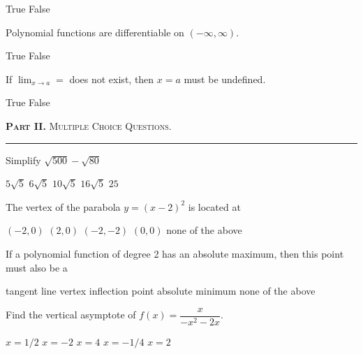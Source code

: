 \documentclass[legalpaper, 12pt, addpoints]{exam}
\begin{document}
\begin{questions}
\begin{oneparchoices}
    \CorrectChoice True
    \choice False
\end{oneparchoices}

\question  Polynomial functions are differentiable on \((-\infty,\infty)\).

\begin{oneparchoices}
    \CorrectChoice True
    \choice False
\end{oneparchoices}


\question  If $\lim_{x\to a} =$ does not exist, then $x=a$ must be undefined.

\begin{oneparchoices}
    \choice True
    \CorrectChoice False
\end{oneparchoices}

\vspace{0.2in}

\parbox{6in}{\textsc{\textbf{Part II.} Multiple Choice Questions.}}
\vspace{0.1in}
\hrule
\vspace{0.1in}


\question Simplify $\sqrt{500} - \sqrt{80}$
    \begin{choices}
            \choice $5\sqrt{5}$
            \CorrectChoice $6\sqrt{5}$
            \choice $10\sqrt{5}$
            \choice $16\sqrt{5}$
            \choice $25$
    \end{choices}
    
\question The vertex of the parabola $y=(x-2)^2$ is located at
        \begin{choices}
            \choice $(-2,0)$
            \CorrectChoice $(2,0)$
            \choice $(-2,-2)$
            \choice $(0, 0)$
            \choice none of the above
        \end{choices}
        
\pagebreak

\question If a polynomial function of degree 2 has an absolute maximum, then this point must also be a
        \begin{choices}
            \choice tangent line
            \CorrectChoice vertex
            \choice inflection point
            \choice absolute minimum 
            \choice none of the above
        \end{choices}
\vspace{0.10in}

\question Find the vertical asymptote of $f(x)=\dfrac{x}{-x^2-2x}$.
        \begin{choices}
        \choice $x = 1/2$
        \CorrectChoice $x=-2$
        \choice $x=4$
        \choice $x = -1/4$
        \choice $x=2$
        \end{choices}
    \vspace{0.10in}


\end{questions}
\end{document}
